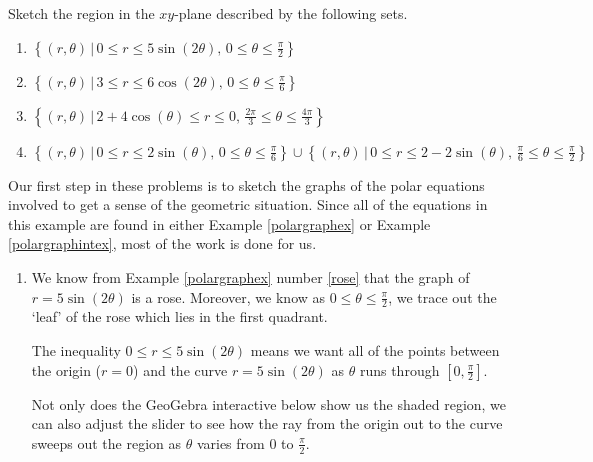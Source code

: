 \documentclass{ximera}
\begin{document}
\begin{example} \label{polarregionex}  Sketch the region in the $xy$-plane described by the following sets.

\begin{enumerate}

\item  $\left\{ (r,\theta) \, | \, 0 \leq r \leq 5\sin(2\theta), \, 0 \leq \theta \leq \frac{\pi}{2} \right\}$

\item  $\left\{ (r,\theta) \, | \, 3 \leq r \leq 6 \cos(2\theta), \, 0 \leq \theta \leq \frac{\pi}{6} \right\}$

\item  $\left\{ (r,\theta) \, | \, 2+4\cos(\theta) \leq r \leq 0, \, \frac{2\pi}{3} \leq \theta \leq \frac{4\pi}{3} \right\}$

\item  $ \left\{ (r,\theta) \, | \, 0\leq r \leq 2\sin(\theta), \,  0 \leq \theta \leq \frac{\pi}{6} \right\} \cup \left\{ (r,\theta) \, | \, 0\leq r \leq 2-2\sin(\theta), \, \frac{\pi}{6} \leq \theta \leq \frac{\pi}{2} \right\}$

\end{enumerate}

\begin{explanation} Our first step in these problems is to sketch the graphs of the polar equations involved to get a sense of the geometric situation.  Since all of the equations in this example are found in either Example \ref{polargraphex} or Example \ref{polargraphintex}, most of the work is done for us.

\begin{enumerate}

\item  We know from  Example \ref{polargraphex} number \ref{rose} that the graph of $r = 5\sin(2\theta)$ is a rose.  Moreover, we know  as  $0 \leq \theta \leq \frac{\pi}{2}$,  we trace out the `leaf' of the rose which lies in the first quadrant. 

 The inequality $0 \leq r \leq 5\sin(2\theta)$ means we want  all of the points between the origin ($r=0$) and the curve $r = 5\sin(2\theta)$ as $\theta$ runs through $\left[0, \frac{\pi}{2}\right]$.

 Not only does the GeoGebra interactive below show us the shaded region, we can also adjust the slider to see how the ray from the origin out to the curve sweeps out the region as $\theta$ varies from $0$ to $\frac{\pi}{2}$.


\end{enumerate}
\end{explanation}
\end{example}
\end{document}
